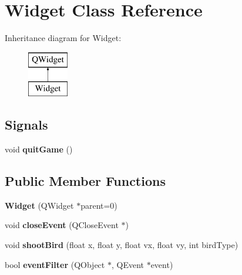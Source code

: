 \hypertarget{classWidget}{\section{Widget Class Reference}
\label{classWidget}
}
Inheritance diagram for Widget\-:\begin{figure}[H]
\begin{center}
\leavevmode
\includegraphics[height=2.000000cm]{classWidget}
\end{center}
\end{figure}
\subsection*{Signals}
\begin{DoxyCompactItemize}
\item 
\hypertarget{classWidget_a2b618e77aff63e7bc4dca1108b1bd889}{void {\bfseries quit\-Game} ()}\label{classWidget_a2b618e77aff63e7bc4dca1108b1bd889}

\end{DoxyCompactItemize}
\subsection*{Public Member Functions}
\begin{DoxyCompactItemize}
\item 
\hypertarget{classWidget_a29531c7f141e461322981b3b579d4590}{{\bfseries Widget} (Q\-Widget $\ast$parent=0)}\label{classWidget_a29531c7f141e461322981b3b579d4590}

\item 
\hypertarget{classWidget_a04fdadbe60fb6ae123c11c3385cb7015}{void {\bfseries close\-Event} (Q\-Close\-Event $\ast$)}\label{classWidget_a04fdadbe60fb6ae123c11c3385cb7015}

\item 
\hypertarget{classWidget_a6da43b19f7b57a59d2a08c6488217c98}{void {\bfseries shoot\-Bird} (float x, float y, float vx, float vy, int bird\-Type)}\label{classWidget_a6da43b19f7b57a59d2a08c6488217c98}

\item 
\hypertarget{classWidget_ab85855521cc554efe43241d061ce7dbd}{bool {\bfseries event\-Filter} (Q\-Object $\ast$, Q\-Event $\ast$event)}\label{classWidget_ab85855521cc554efe43241d061ce7dbd}

\end{DoxyCompactItemize}
